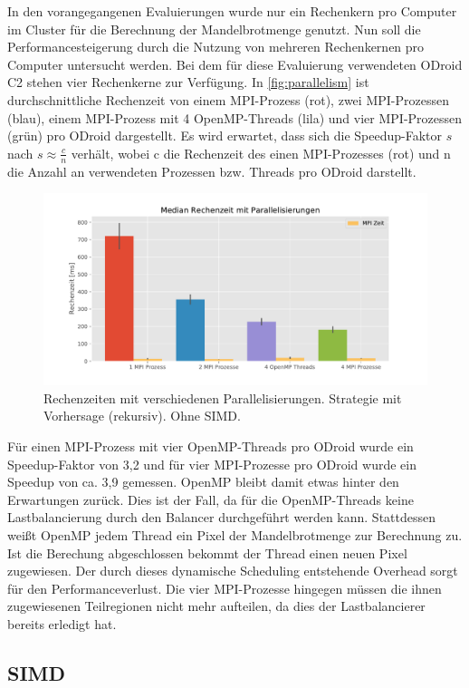 In den vorangegangenen Evaluierungen wurde nur ein Rechenkern pro Computer im Cluster für die Berechnung der Mandelbrotmenge genutzt. 
Nun soll die Performancesteigerung durch die Nutzung von mehreren Rechenkernen pro Computer 
untersucht werden. Bei dem für diese Evaluierung verwendeten ODroid C2 stehen vier Rechenkerne zur Verfügung.
In \autoref{fig:parallelism} ist durchschnittliche Rechenzeit von einem MPI-Prozess (rot), zwei MPI-Prozessen (blau), einem MPI-Prozess 
mit 4 OpenMP-Threads (lila) und vier MPI-Prozessen (grün) pro ODroid dargestellt. 
Es wird erwartet, dass sich die Speedup-Faktor \( s \) nach \( s \approx \frac{c}{n} \) verhält, 
wobei c die Rechenzeit des einen MPI-Prozesses (rot) und n die Anzahl an verwendeten Prozessen bzw. 
Threads pro ODroid darstellt.
\begin{figure}[h!]
	\centering
	\includegraphics[width=0.9\linewidth]{img/Evaluation/parallelism.pdf}
	\caption{Rechenzeiten mit verschiedenen Parallelisierungen. Strategie mit Vorhersage (rekursiv). Ohne SIMD.}
	\label{fig:parallelism}
\end{figure}

Für einen MPI-Prozess mit vier OpenMP-Threads pro ODroid wurde ein Speedup-Faktor von 3,2 und für vier MPI-Prozesse 
pro ODroid wurde ein Speedup von ca. 3,9 gemessen. 
OpenMP bleibt damit etwas hinter den Erwartungen zurück. 
Dies ist der Fall, da für die OpenMP-Threads keine Lastbalancierung durch den Balancer durchgeführt werden kann. 
Stattdessen weißt OpenMP jedem Thread ein Pixel der Mandelbrotmenge zur Berechnung zu. 
Ist die Berechung abgeschlossen bekommt der Thread einen neuen Pixel zugewiesen. 
Der durch dieses dynamische Scheduling entstehende Overhead sorgt für den Performanceverlust. 
Die vier MPI-Prozesse hingegen müssen die ihnen zugewiesenen Teilregionen nicht mehr aufteilen, 
da dies der Lastbalancierer bereits erledigt hat.


\subsection{SIMD}

